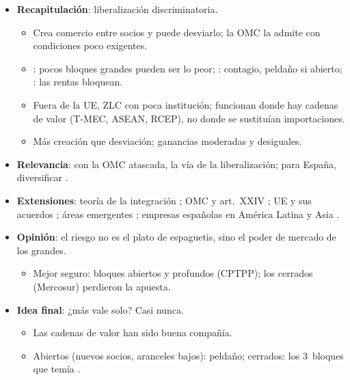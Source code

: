 \documentclass{article}
\begin{document}
\begin{columnas}
\begin{itemize}
\item \textbf{Recapitulación}: liberalización discriminatoria.
  \begin{itemize}
  \item Crea comercio entre socios y puede desviarlo; la OMC la admite con condiciones poco exigentes.
  \item {}: pocos bloques grandes pueden ser lo peor; : contagio, peldaño si abierto; : las rentas bloquean.
  \item Fuera de la UE, ZLC con poca institución; funcionan donde hay cadenas de valor (T-MEC, ASEAN, RCEP), no donde se sustituían importaciones.
  \item Más creación que desviación; ganancias moderadas y desiguales.
  \end{itemize}
\item \textbf{Relevancia}: con la OMC atascada, la vía de la liberalización; para España, diversificar .
\item \textbf{Extensiones}: teoría de la integración ; OMC y art.~XXIV ; UE  y sus acuerdos ; áreas emergentes ; empresas españolas en América Latina y Asia .
\item \textbf{Opinión}: el riesgo no es el plato de espaguetis, sino el poder de mercado de los grandes.
  \begin{itemize}
  \item Mejor seguro: bloques abiertos y profundos (CPTPP); los cerrados (Mercosur) perdieron la apuesta.
  \end{itemize}
\item \textbf{Idea final}: ¿más vale solo? Casi nunca.
  \begin{itemize}
  \item Las cadenas de valor han sido buena compañía.
  \item Abiertos (nuevos socios, aranceles bajos): peldaño; cerrados: los 3~bloques que temía .
  \end{itemize}
\end{itemize}


\end{columnas}
\end{document}
